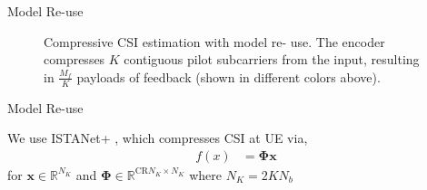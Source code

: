 \documentclass{beamer}
\begin{document}
  \begin{frame}{Model Re-use}
    \begin{figure}
      \centering
      {
        \fontsize{8pt}{8pt}
        \def\svgwidth{1.0\linewidth}
        
      }
      \caption{Compressive CSI estimation with model re-
      use. %
      The encoder compresses $K$ contiguous pilot subcarriers
      from the input, resulting in $\frac{M_f}{K}$ payloads of feedback
      (shown in different colors above). 
      }
      \label{fig:model_reuse}
    \end{figure}
  \end{frame}

  \begin{frame}{Model Re-use}
    \begin{figure}
      \centering
      {
        \fontsize{8pt}{8pt}
        \def\svgwidth{1.0\linewidth}
        
      }
      \label{fig:model_reuse_w_flat}
    \end{figure}
    We use ISTANet+ \cite{ref:zhang2018ista},
    which compresses CSI at UE via, 
    \begin{align}
        f(x) &= \mathbf{\Phi}\mathbf{x}
    \end{align}
    for $\mathbf{x} \in \mathbb{R}^{N_K}$ and $\mathbf{\Phi} \in \mathbb{R}^{\text{CR} N_K  \times N_K}$ where $N_K = 2 K N_b$
  \end{frame}
\end{document}
